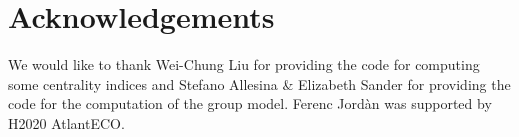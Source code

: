 \section*{Acknowledgements}

We would like to thank Wei-Chung Liu for providing the code for computing some centrality indices and Stefano Allesina \& Elizabeth Sander for providing the code for the  computation of the group model. Ferenc Jordàn was supported by H2020 AtlantECO.
